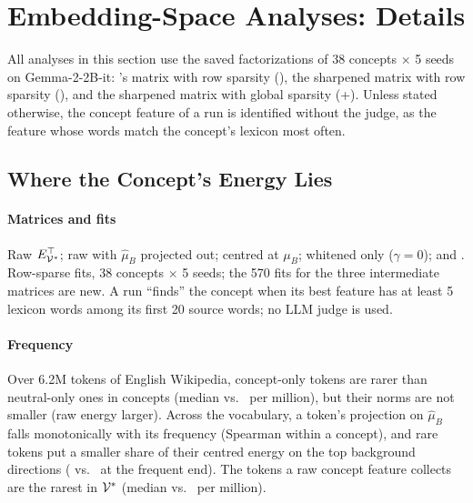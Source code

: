\section{Embedding-Space Analyses: Details}
\label{app:analyses}

All analyses in this section use the saved factorizations of 38 concepts $\times$ 5 seeds on Gemma-2-2B-it: \ember{}'s matrix with row sparsity (\ember{}), the sharpened matrix with row sparsity (\cs{}), and the sharpened matrix with global sparsity (\cs{}+\gs{}).
Unless stated otherwise, the concept feature of a run is identified without the judge, as the feature whose words match the concept's lexicon most often.

\subsection{Where the Concept's Energy Lies}
\label{app:energy}
\paragraph{Matrices and fits}
Raw $E_{\mathcal{V}^*}^{\top}$; raw with $\hat\mu_B$ projected out; centred at $\mu_B$; whitened only ($\gamma = 0$); and \cs{}. Row-sparse fits, 38 concepts $\times$ 5 seeds; the 570 fits for the three intermediate matrices are new. A run ``finds'' the concept when its best feature has at least 5 lexicon words among its first 20 source words; no LLM judge is used.

\paragraph{Frequency}
Over 6.2M tokens of English Wikipedia, concept-only tokens are rarer than neutral-only ones in  concepts (median  vs.\  per million), but their norms are not smaller (raw energy  larger). Across the vocabulary, a token's projection on $\hat\mu_B$ falls monotonically with its frequency (Spearman  within a concept), and rare tokens put a smaller share of their centred energy on the top background directions ( vs.\  at the frequent end). The tokens a raw concept feature collects are the rarest in $\mathcal{V}^*$ (median  vs.\  per million).

